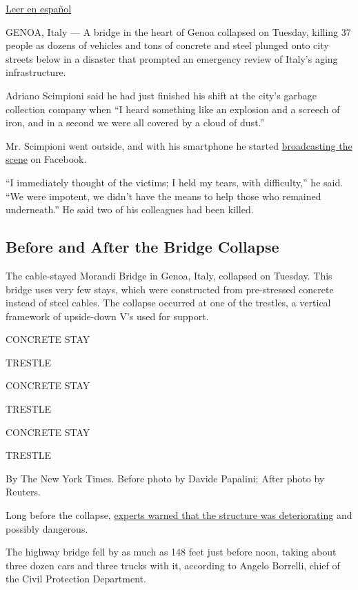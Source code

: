 \href{https://www.nytimes.com/es/2018/08/14/genova-puente-italia}{Leer
en español}

GENOA, Italy --- A bridge in the heart of Genoa collapsed on Tuesday,
killing 37 people as dozens of vehicles and tons of concrete and steel
plunged onto city streets below in a disaster that prompted an emergency
review of Italy's aging infrastructure.

Adriano Scimpioni said he had just finished his shift at the city's
garbage collection company when ``I heard something like an explosion
and a screech of iron, and in a second we were all covered by a cloud of
dust.''

Mr. Scimpioni went outside, and with his smartphone he started
\href{https://www.facebook.com/adriano.scipioni/videos/1637149753056595/}{broadcasting
the scene} on Facebook.

``I immediately thought of the victims; I held my tears, with
difficulty,'' he said. ``We were impotent, we didn't have the means to
help those who remained underneath.'' He said two of his colleagues had
been killed.

\hypertarget{before-and-after-the-bridge-collapse}{%
\subsection{Before and After the Bridge
Collapse}\label{before-and-after-the-bridge-collapse}}

The cable-stayed Morandi Bridge in Genoa, Italy, collapsed on Tuesday.
This bridge uses very few stays, which were constructed from
pre-stressed concrete instead of steel cables. The collapse occurred at
one of the trestles, a vertical framework of upside-down V's used for
support.

CONCRETE STAY

TRESTLE

CONCRETE STAY

TRESTLE

CONCRETE STAY

TRESTLE

By The New York Times. Before photo by Davide Papalini; After photo by
Reuters.

Long before the collapse,
\href{https://www.nytimes.com/2018/08/15/world/europe/italy-genoa-bridge-collapse.html?action=click\&module=Intentional\&pgtype=Article}{experts
warned that the structure was deteriorating} and possibly dangerous.

The highway bridge fell by as much as 148 feet just before noon, taking
about three dozen cars and three trucks with it, according to Angelo
Borrelli, chief of the Civil Protection Department.

